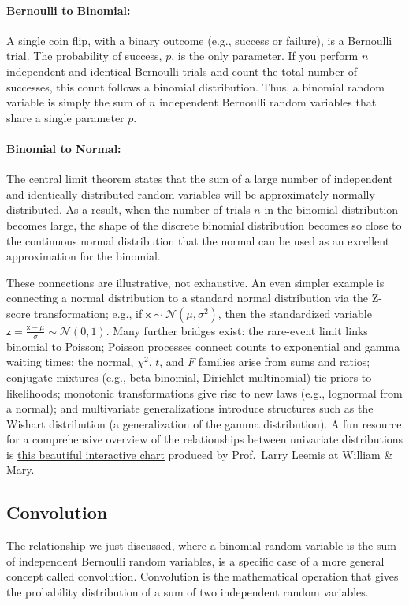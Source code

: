\paragraph*{Bernoulli to Binomial:} A single coin flip, with a binary outcome (e.g., success or failure), is a Bernoulli trial. The probability of success, $p$, is the only parameter. If you perform $n$ independent and identical Bernoulli trials and count the total number of successes, this count follows a binomial distribution. Thus, a binomial random variable is simply the sum of $n$ independent Bernoulli random variables that share a single parameter $p$.
    
\paragraph*{Binomial to Normal:} The central limit theorem states that the sum of a large number of independent and identically distributed random variables will be approximately normally distributed. As a result, when the number of trials $n$ in the binomial distribution becomes large, the shape of the discrete binomial distribution becomes so close to the continuous normal distribution that the normal can be used as an excellent approximation for the binomial.

These connections are illustrative, not exhaustive. An even simpler example is connecting a normal distribution to a standard normal distribution via the Z-score transformation; e.g., if $\mathsf{x} \sim \mathcal{N}(\mu, \sigma^2)$, then the standardized variable $\mathsf{z} = \frac{\mathsf{x} - \mu}{\sigma} \sim \mathcal{N}(0, 1)$. Many further bridges exist: the rare-event limit links binomial to Poisson; Poisson processes connect counts to exponential and gamma waiting times; the normal, $\chi^2$, $t$, and $F$ families arise from sums and ratios; conjugate mixtures (e.g., beta-binomial, Dirichlet-multinomial) tie priors to likelihoods; monotonic transformations give rise to new laws (e.g., lognormal from a normal); and multivariate generalizations introduce structures such as the Wishart distribution (a generalization of the gamma distribution). A fun resource for a comprehensive overview of the relationships between univariate distributions is \href{https://www.math.wm.edu/~leemis/chart/UDR/UDR.html}{this beautiful interactive chart} produced by Prof.\ Larry Leemis at William \& Mary.

\subsection{Convolution}
The relationship we just discussed, where a binomial random variable is the sum of independent Bernoulli random variables, is a specific case of a more general concept called convolution. Convolution is the mathematical operation that gives the probability distribution of a sum of two independent random variables.

